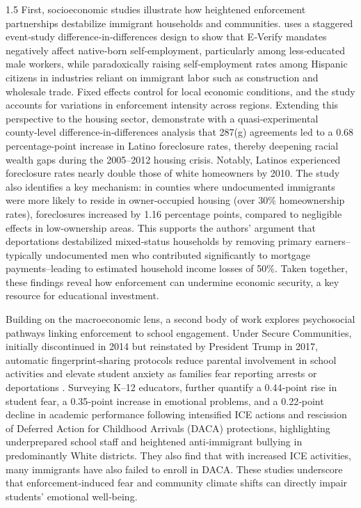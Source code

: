 \documentclass[12pt]{article}
\begin{document}
\begin{spacing}{1.5}
First, socioeconomic studies illustrate how heightened enforcement partnerships destabilize immigrant households and communities. \citet{cordova_nodate} uses a staggered event‑study difference‑in‑differences design to show that E‑Verify mandates negatively affect native‑born self‑employment, particularly among less‑educated male workers, while paradoxically raising self‑employment rates among Hispanic citizens in industries reliant on immigrant labor such as construction and wholesale trade. Fixed effects control for local economic conditions, and the study accounts for variations in enforcement intensity across regions. Extending this perspective to the housing sector, \citet{rugh2016} demonstrate with a quasi-experimental county‑level difference‑in‑differences analysis that 287(g) agreements led to a 0.68 percentage‑point increase in Latino foreclosure rates, thereby deepening racial wealth gaps during the 2005–2012 housing crisis. Notably, Latinos experienced foreclosure rates nearly double those of white homeowners by 2010. The study also identifies a key mechanism: in counties where undocumented immigrants were more likely to reside in owner-occupied housing (over 30\% homeownership rates), foreclosures increased by 1.16 percentage points, compared to negligible effects in low-ownership areas. This supports the authors’ argument that deportations destabilized mixed-status households by removing primary earners–typically undocumented men who contributed significantly to mortgage payments–leading to estimated household income losses of 50\%. Taken together, these findings reveal how enforcement can undermine economic security, a key resource for educational investment.

Building on the macroeconomic lens, a second body of work explores psychosocial pathways linking enforcement to school engagement. Under Secure Communities, initially discontinued in 2014 but reinstated by President Trump in 2017, automatic fingerprint‑sharing protocols reduce parental involvement in school activities and elevate student anxiety as families fear reporting arrests or deportations \citep{amuedo2015}. Surveying K–12 educators, \citet{gandara2018} further quantify a 0.44‑point rise in student fear, a 0.35‑point increase in emotional problems, and a 0.22‑point decline in academic performance following intensified ICE actions and rescission of Deferred Action for Childhood Arrivals (DACA) protections, highlighting underprepared school staff and heightened anti‑immigrant bullying in predominantly White districts. They also find that with increased ICE activities, many immigrants have also failed to enroll in DACA. These studies underscore that enforcement‑induced fear and community climate shifts can directly impair students’ emotional well‑being.


\end{spacing}
\end{document}
